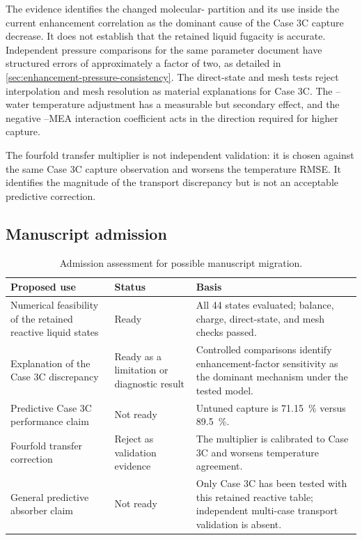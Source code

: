 The evidence identifies the changed molecular- partition and its use
inside the current enhancement correlation as the dominant cause of the Case
3C capture decrease.  It does not establish that the retained liquid fugacity
is accurate.  Independent pressure comparisons for the same parameter
document have structured errors of approximately a factor of two, as detailed
in \cref{sec:enhancement-pressure-consistency}.  The direct-state and mesh
tests reject interpolation and mesh resolution as material explanations for
Case 3C.  The --water temperature adjustment has a measurable but
secondary effect, and the negative --MEA interaction coefficient acts
in the direction required for higher capture.

The fourfold transfer multiplier is not independent validation: it is chosen
against the same Case 3C capture observation and worsens the temperature RMSE.
It identifies the magnitude of the transport discrepancy but is not an
acceptable predictive correction.

\clearpage
\subsection*{Manuscript admission}

\begin{table}[ht]
    \centering
    \caption{Admission assessment for possible manuscript migration.}
    \label{tab:case3c-admission}
    \small
    \begin{tabularx}{\textwidth}{@{}>{\raggedright\arraybackslash}p{}>{\raggedright\arraybackslash}p{}>{\raggedright\arraybackslash}X@{}}
        \toprule
        Proposed use & Status & Basis \\
        \midrule
        Numerical feasibility of the retained reactive liquid states & Ready & All 44 states evaluated; balance, charge, direct-state, and mesh checks passed. \\
        Explanation of the Case 3C discrepancy & Ready as a limitation or diagnostic result & Controlled comparisons identify enhancement-factor sensitivity as the dominant mechanism under the tested model. \\
        Predictive Case 3C performance claim & Not ready & Untuned capture is \SI{71.15}{\percent} versus \SI{89.5}{\percent}. \\
        Fourfold transfer correction & Reject as validation evidence & The multiplier is calibrated to Case 3C and worsens temperature agreement. \\
        General predictive absorber claim & Not ready & Only Case 3C has been tested with this retained reactive table; independent multi-case transport validation is absent. \\
        \bottomrule
    \end{tabularx}
\end{table}

